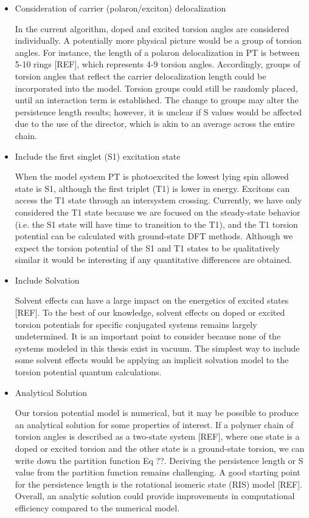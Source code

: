 \begin{itemize}
  \item Consideration of carrier (polaron/exciton) delocalization

  In the current algorithm, doped and excited torsion angles are considered individually. A potentially more physical picture would be a group of torsion angles. For instance, the length of a polaron delocalization in PT is between 5-10 rings [REF], which represents 4-9 torsion angles. Accordingly, groups of torsion angles that reflect the carrier delocalization length could be incorporated into the model. Torsion groups could still be randomly placed, until an interaction term is established. The change to groups may alter the persistence length results; however, it is unclear if S values would be affected due to the use of the director, which is akin to an average across the entire chain.

  \item Include the first singlet (S1) excitation state

  When the model system PT is photoexcited the lowest lying spin allowed state is S1, although the first triplet (T1) is lower in energy. Excitons can access the T1 state through an intersystem crossing. Currently, we have only considered the T1 state because we are focused on the steady-state behavior (i.e. the S1 state will have time to transition to the T1), and the T1 torsion potential can be calculated with ground-state DFT methods. Although we expect the torsion potential of the S1 and T1 states to be qualitatively similar it would be interesting if any quantitative differences are obtained.

  \item Include Solvation

  Solvent effects can have a large impact on the energetics of excited states [REF]. To the best of our knowledge, solvent effects on doped or excited torsion potentials for specific conjugated systems remains largely undetermined. It is an important point to consider because none of the systems modeled in this thesis exist in vacuum. The simplest way to include some solvent effects would be applying an implicit solvation model to the torsion potential quantum calculations.

  \item Analytical Solution

  Our torsion potential model is numerical, but it may be possible to produce an analytical solution for some properties of interest. If a polymer chain of torsion angles is described as a two-state system [REF], where one state is a doped or excited torsion and the other state is a ground-state torsion, we can write down the partition function Eq ??. Deriving the persistence length or S value from the partition function remains challenging. A good starting point for the persistence length is the rotational isomeric state (RIS) model [REF]. Overall, an analytic solution could provide improvements in computational efficiency compared to the numerical model.

\end{itemize}

